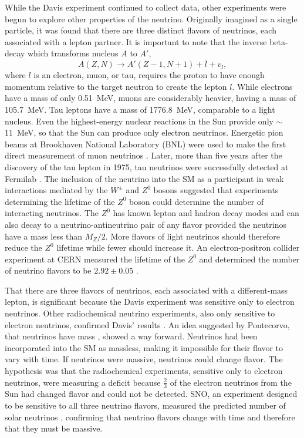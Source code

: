 While the Davis experiment continued to collect data, other experiments were begun to explore other properties of the neutrino.  Originally imagined as a single particle, it was found that there are three distinct flavors of neutrinos, each associated with a lepton partner.  It is important to note that the inverse beta-decay which transforms nucleus $A$ to $A'$,
\begin{equation}
A(Z,N) \rightarrow A'(Z-1,N+1) + \overline{l} + v_l,
\end{equation}
where $l$ is an electron, muon, or tau, requires the proton to have enough momentum relative to the target neutron to create the lepton $l$.  While electrons have a mass of only 0.51~MeV, muons are considerably heavier, having a mass of 105.7~MeV.  Tau leptons have a mass of 1776.8~MeV, comparable to a light nucleus. Even the highest-energy nuclear reactions in the Sun provide only $\sim$11~MeV, so that the Sun can produce only electron neutrinos.  Energetic pion beams at Brookhaven National Laboratory (BNL) were used to make the first direct measurement of muon neutrinos \citep{muonNeutrino}.  Later, more than five years after the discovery of the tau lepton \citep{tauDiscovery} in 1975, tau neutrinos were successfully detected at Fermilab \citep{tauNeutrino}.  The inclusion of the neutrino into the SM as a participant in weak interactions mediated by the $W^{\pm}$ and $Z^0$ bosons suggested that experiments determining the lifetime of the $Z^0$ boson could determine the number of interacting neutrinos.  The $Z^0$ has known lepton and hadron decay modes \citep{PDG} and can also decay to a neutrino-antineutrino pair of any flavor provided the neutrinos have a mass less than $M_Z/2$.  More flavors of light neutrinos should therefore reduce the $Z^0$ lifetime while fewer should increase it.   An electron-positron collider experiment at CERN measured the lifetime of the $Z^0$ and determined the number of neutrino flavors to be $2.92\pm0.05$ \citep{PDG}.

That there are three flavors of neutrinos, each associated with a different-mass lepton, is significant because the Davis experiment was sensitive only to electron neutrinos.  Other radiochemical neutrino experiments, also only sensitive to electron neutrinos, confirmed Davis' results \citep{SNO_Sun,SuperK_Sun,PDG}.  An idea suggested by Pontecorvo, that neutrinos have mass \citep{Pontecorvo}, showed a way forward.  Neutrinos had been incorporated into the SM as massless, making it impossible for their flavor to vary with time.  If neutrinos were massive, neutrinos could change flavor.  The hypothesis was that the radiochemical experiments, sensitive only to electron neutrinos, were measuring a deficit because $\frac{2}{3}$ of the electron neutrinos from the Sun had changed flavor and could not be detected.  SNO, an experiment designed to be sensitive to all three neutrino flavors, measured the predicted number of solar neutrinos \citep{SNO_Sun}, confirming that neutrino flavors change with time and therefore that they must be massive.

